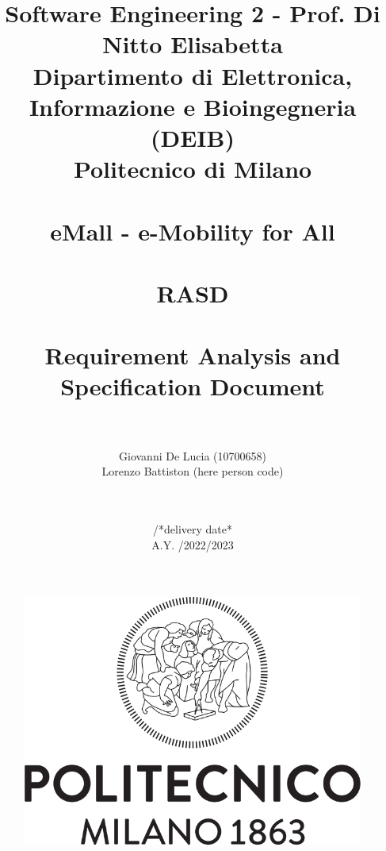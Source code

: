 \documentclass{article}
\title{
  {\small Software Engineering 2 - Prof. Di Nitto Elisabetta \\
  Dipartimento di Elettronica, Informazione e Bioingegneria (DEIB) \\ Politecnico di Milano} \\ \hfill \\
  \textbf{eMall - e-Mobility for All} \\ \hfill \\
  \large RASD \\ \hfill \\
    Requirement Analysis and Specification Document \\ \hfill \\}
\author{Giovanni De Lucia (10700658) \\ Lorenzo Battiston (here person code) \\ \hfill \\}
\date{\hfill \\ /*delivery date* \\ A.Y. /2022/2023}
\begin{document}
\maketitle

\begin{figure}[h]
    \centering
    \includegraphics[scale=0.2]{src/Logo_Politecnico_Milano.png}
\end{figure}

\pagebreak

\tableofcontents







\end{document}
